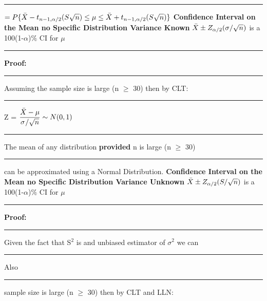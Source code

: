 \documentclass[]{article}
\begin{document}
\newline\Large\rule{4.3cm}{0pt}  $=  P \{ \bar{X}  - t_{n - 1, \alpha \\/ 2} (S \/ \sqrt{n})  \le \mu \le \bar{X} +  t_{n - 1, \alpha \\/ 2}( S \/ \sqrt{n})  \}$
\newline
\newline
\Large\textbf{Confidence Interval on the Mean no Specific Distribution \newline Variance Known}
\newline
\newline $ \bar{X} \pm Z_{\alpha\\/2} (\sigma / \sqrt{n}) $ is a 100(1-$\alpha$)$\%$ CI for $\mu$ 
\newline 
\newline\Large\rule{3.0cm}{0pt} \textbf{Proof:}
\newline\Large\rule{3.0cm}{0pt} Assuming the sample size is large (n $\ge$ 30) then by CLT:
\newline
\newline\Large\rule{3.0cm}{0pt}  Z = $\dfrac{\bar{X} - \mu}{\sigma \\/ \sqrt{n} } \sim N(0,1)$
\newline
\newline\Large\rule{3.0cm}{0pt} The mean of any distribution \textbf{provided} n is large (n $\ge$ 30) \newline\Large\rule{3.0cm}{0pt} can be approximated using a Normal Distribution.
\newline
\newline
\Large\textbf{Confidence Interval on the Mean no Specific Distribution \newline Variance Unknown}
\newline
\newline $ \bar{X} \pm Z_{\alpha\\/2} ( S / \sqrt{n}) $ is a 100(1-$\alpha$)$\%$ CI for $\mu$ 
\newline 
\newline\Large\rule{3.0cm}{0pt} \textbf{Proof:}
\newline\Large\rule{3.0cm}{0pt} Given the fact that S$^2$ is and unbiased estimator of $\sigma ^2$ we can
\newline\Large\rule{3.0cm}{0pt}  Also
\newline\Large\rule{3.0cm}{0pt}  sample size is large (n $\ge$ 30) then by CLT and LLN:
\newline
\end{document}
